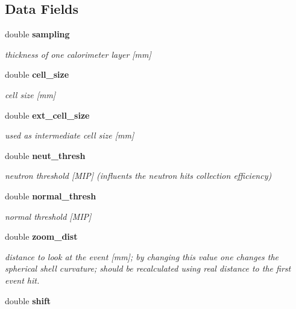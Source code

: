 \subsection*{Data Fields}
\begin{DoxyCompactItemize}
\item 
double {\bf sampling}\label{classDeepAnalysis_1_1Detector_a5d4e2fd38f01156c20f84816433b369d}

\begin{DoxyCompactList}\small\item\em thickness of one calorimeter layer [mm] \item\end{DoxyCompactList}\item 
double {\bf cell\_\-size}\label{classDeepAnalysis_1_1Detector_afabe7007b58b1375246c18dd7d9d20d3}

\begin{DoxyCompactList}\small\item\em cell size [mm] \item\end{DoxyCompactList}\item 
double {\bf ext\_\-cell\_\-size}\label{classDeepAnalysis_1_1Detector_a314297278178abfed53b28212aaf3403}

\begin{DoxyCompactList}\small\item\em used as intermediate cell size [mm] \item\end{DoxyCompactList}\item 
double {\bf neut\_\-thresh}\label{classDeepAnalysis_1_1Detector_a114be573c7073f49bf04b1998ba7b87b}

\begin{DoxyCompactList}\small\item\em neutron threshold [MIP] (influents the neutron hits collection efficiency) \item\end{DoxyCompactList}\item 
double {\bf normal\_\-thresh}\label{classDeepAnalysis_1_1Detector_a5f70ea7b0b17eade3462cf0da58e7655}

\begin{DoxyCompactList}\small\item\em normal threshold [MIP] \item\end{DoxyCompactList}\item 
double {\bf zoom\_\-dist}
\begin{DoxyCompactList}\small\item\em distance to look at the event [mm]; by changing this value one changes the spherical shell curvature; should be recalculated using real distance to the first event hit. \item\end{DoxyCompactList}\item 
double {\bf shift}\label{classDeepAnalysis_1_1Detector_a9d492b2a1c405d6eea0c7c7273d87e18}


\end{DoxyCompactItemize}
